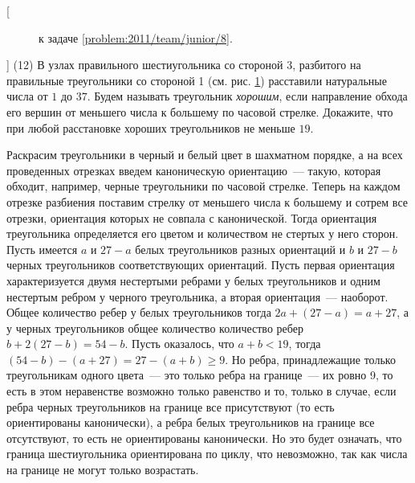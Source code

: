 [{\begin{figure}
\centering
\caption{к задаче \ref{problem:2011/team/junior/8}.}
\label{fig:problem:2011/team/junior/8}
\end{figure}}]%
\textsf{(12)}
\label{problem:2011/team/junior/8}%
В узлах правильного шестиугольника со стороной 3, разбитого на правильные
треугольники со стороной 1
(см. рис. \ref{fig:problem:2011/team/junior/8})
расставили натуральные числа от $1$ до $37$.
Будем называть треугольник \emph{хорошим}, если направление обхода его вершин от
меньшего числа к большему по часовой стрелке.
Докажите, что при любой расстановке хороших треугольников не меньше $19$.

\solution
Раскрасим треугольники в черный и белый цвет в шахматном порядке, а на всех
проведенных отрезках введем каноническую ориентацию~--- такую, которая обходит,
например, черные треугольники по часовой стрелке.
Теперь на каждом отрезке разбиения поставим стрелку от меньшего числа к
большему и сотрем все отрезки, ориентация которых не совпала с канонической.
Тогда ориентация треугольника определяется его цветом и количеством не стертых
у него сторон.
Пусть имеется $a$ и $27 - a$ белых треугольников разных ориентаций и $b$ и
$27 - b$ черных треугольников соответствующих ориентаций.
Пусть первая ориентация характеризуется двумя нестертыми ребрами у белых
треугольников и одним нестертым ребром у черного треугольника, а вторая
ориентация~--- наоборот.
Общее количество ребер у белых треугольников тогда
$2 a + (27 - a) = a + 27$, а у черных треугольников общее количество количество
ребер $b + 2 (27 - b) = 54 - b$.
Пусть оказалось, что $a + b < 19$, тогда
$(54 - b) - (a + 27) = 27 - (a + b) \geq 9$.
Но ребра, принадлежащие только треугольникам одного цвета~--- это только ребра
на границе~--- их ровно 9, то есть в этом неравенстве возможно только равенство
и то, только в случае, если ребра черных треугольников на границе все
присутствуют (то есть ориентированы канонически), а ребра белых треугольников
на границе все отсутствуют, то есть не ориентированы канонически.
Но это будет означать, что граница шестиугольника ориентирована по циклу, что
невозможно, так как числа на границе не могут только возрастать.

